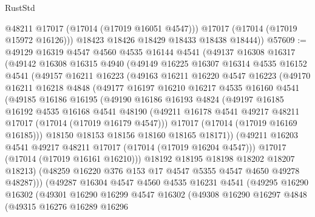 \begin{lexlean}{RustStd}
\begin{coremodule}
            @48211
            @17017
            (@17014 (@17019 @16051 @4547)))
          @17017
          (@17014 (@17019 @15972 @16126)))
        @18423
        @18426
        @18429
        @18433
        @18438
        @18444))
@57609 := @49129
    @16319
    @4547
    @4560
    @4535
    @16144
    @4541
    (@49137
      @16308
      @16317
      (@49142
        @16308
        @16315
        @4940
        (@49149
          @16225
          @16307
          @16314
          @4535
          @16152
          @4541
          (@49157
            @16211
            @16223
            (@49163
              @16211
              @16220
              @4547
              @16223
              (@49170
                @16211
                @16218
                @4848
                (@49177
                  @16197
                  @16210
                  @16217
                  @4535
                  @16160
                  @4541
                  (@49185
                    @16186
                    @16195
                    (@49190
                      @16186
                      @16193
                      @4824
                      (@49197
                        @16185
                        @16192
                        @4535
                        @16168
                        @4541
                        @48190
                        (@49211 @16178 @4541 @49217 @48211 @17017 (@17014 (@17019 @16179 @4547)))
                        @17017
                        (@17014 (@17019 @16169 @16185)))
                      @18150
                      @18153
                      @18156
                      @18160
                      @18165
                      @18171))
                  (@49211 @16203 @4541 @49217 @48211 @17017 (@17014 (@17019 @16204 @4547)))
                  @17017
                  (@17014 (@17019 @16161 @16210)))
                @18192
                @18195
                @18198
                @18202
                @18207
                @18213)
              (@48259 @16220 @376 @153 @17 @4547 @5355 @4547 @4650 @49278 @48287)))
          (@49287
            @16304
            @4547
            @4560
            @4535
            @16231
            @4541
            (@49295
              @16290
              @16302
              (@49301
                @16290
                @16299
                @4547
                @16302
                (@49308
                  @16290
                  @16297
                  @4848
                  (@49315
                    @16276
                    @16289
                    @16296

\end{coremodule}
\end{lexlean}
